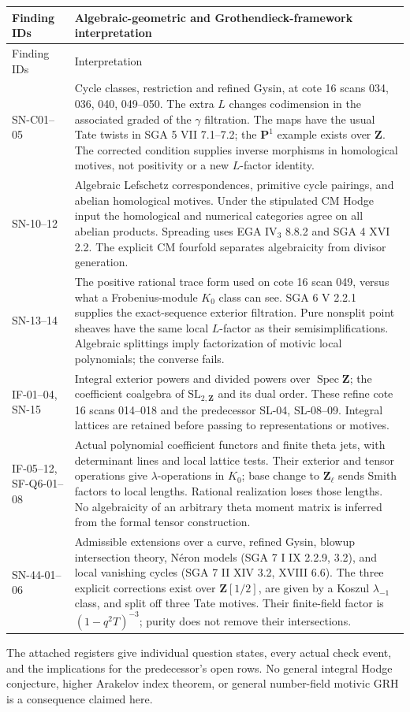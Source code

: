 \begin{longtable}{@{}p{}p{}@{}}
\toprule
Finding IDs & Algebraic-geometric and Grothendieck-framework interpretation\\
\midrule
\endfirsthead
\toprule Finding IDs & Interpretation\\\midrule
\endhead
SN-C01--05 &
Cycle classes, restriction and refined Gysin, at cote 16
scans 034, 036, 040, 049--050.
The extra $L$ changes codimension in the associated graded of
the $\gamma$ filtration. The maps have the usual Tate twists
in SGA 5 VII 7.1--7.2; the $\mathbf P^1$ example exists over
$\mathbf Z$. The corrected condition supplies inverse morphisms
in homological motives, not positivity or a new $L$-factor identity.\\
SN-10--12 &
Algebraic Lefschetz correspondences, primitive cycle pairings,
and abelian homological motives. Under the stipulated CM Hodge
input the homological and numerical categories agree on all
abelian products. Spreading uses EGA IV$_3$ 8.8.2 and
SGA 4 XVI 2.2. The explicit CM fourfold separates algebraicity
from divisor generation.\\
SN-13--14 &
The positive rational trace form used on cote 16 scan 049,
versus what a Frobenius-module $K_0$ class can see.
SGA 6 V 2.2.1 supplies the exact-sequence exterior filtration.
Pure nonsplit point sheaves have the same local $L$-factor
as their semisimplifications. Algebraic splittings imply
factorization of motivic local polynomials; the converse fails.\\
IF-01--04, SN-15 &
Integral exterior powers and divided powers over
$\operatorname{Spec}\mathbf Z$; the coefficient coalgebra
of $\mathrm{SL}_{2,\mathbf Z}$ and its dual order.
These refine cote 16 scans 014--018 and the predecessor
SL-04, SL-08--09. Integral lattices are retained before
passing to representations or motives.\\
IF-05--12, SF-Q6-01--08 &
Actual polynomial coefficient functors and finite theta jets,
with determinant lines and local lattice tests. Their exterior
and tensor operations give $\lambda$-operations in $K_0$;
base change to $\mathbf Z_\ell$ sends Smith factors to local
lengths. Rational realization loses those lengths.
No algebraicity of an arbitrary theta moment matrix is
inferred from the formal tensor construction.\\
SN-44-01--06 &
Admissible extensions over a curve, refined Gysin, blowup
intersection theory, N\'eron models (SGA 7 I IX 2.2.9, 3.2),
and local vanishing cycles (SGA 7 II XIV 3.2, XVIII 6.6).
The three explicit corrections exist over $\mathbf Z[1/2]$,
are given by a Koszul $\lambda_{-1}$ class, and split off
three Tate motives. Their finite-field factor is
$(1-q^2T)^{-3}$; purity does not remove their intersections.\\
\bottomrule
\end{longtable}

The attached registers give individual question states, every actual
check event, and the implications for the predecessor's open rows.
No general integral Hodge conjecture, higher Arakelov index theorem,
or general number-field motivic GRH is a consequence claimed here.

